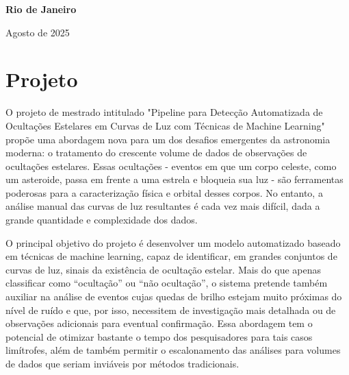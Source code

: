 \documentclass[12pt]{article}
\numberwithin{equation}{section}
\begin{document}
\baselineskip 17pt

\vspace*{1.5cm}
\begin{center}
{{\bf Rio de Janeiro\par{Agosto de 2025}}}
\end{center}

\vspace*{.05cm}


\renewcommand{\thefootnote}{\arabic{footnote}}

\setcounter{footnote}{1}

\pagebreak

\baselineskip 19pt



\pagestyle{fancy}
\tableofcontents
{}



\newpage

\section{\sc Projeto}

O projeto de mestrado intitulado "Pipeline para Detecção Automatizada de Ocultações Estelares em Curvas de Luz com Técnicas de Machine Learning" propõe uma abordagem nova para um dos desafios emergentes da astronomia moderna: o tratamento do crescente volume de dados de observações de ocultações estelares. Essas ocultações - eventos em que um corpo celeste, como um asteroide, passa em frente a uma estrela e bloqueia sua luz - são ferramentas poderosas para a caracterização física e orbital desses corpos. No entanto, a análise manual das curvas de luz resultantes é cada vez mais difícil, dada a grande quantidade e complexidade dos dados.

O principal objetivo do projeto é desenvolver um modelo automatizado baseado em técnicas de machine learning, capaz de identificar, em grandes conjuntos de curvas de luz, sinais da existência de ocultação estelar. Mais do que apenas classificar como “ocultação” ou “não ocultação”, o sistema pretende também auxiliar na análise de eventos cujas quedas de brilho estejam muito próximas do nível de ruído e que, por isso, necessitem de investigação mais detalhada ou de observações adicionais para eventual confirmação. Essa abordagem tem o potencial de otimizar bastante o tempo dos pesquisadores para tais casos limítrofes, além de também permitir o escalonamento das análises para volumes de dados que seriam inviáveis por métodos tradicionais.
\end{document}
